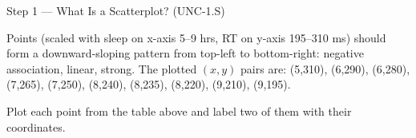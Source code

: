 \documentclass[10pt]{article}
\begin{document}
\begin{notesbox}{Step 1 --- What Is a Scatterplot? (UNC-1.S)}
\begin{teachernote}
Points (scaled with sleep on x-axis 5--9 hrs, RT on y-axis 195--310 ms) should form a
downward-sloping pattern from top-left to bottom-right: negative association, linear, strong.
The plotted $(x,y)$ pairs are: (5,310), (6,290), (6,280), (7,265), (7,250), (8,240),
(8,235), (8,220), (9,210), (9,195).
\end{teachernote}

\vspace{4pt}
Plot each point from the table above and label two of them with their coordinates.
\end{notesbox}

\vspace{0.1in}

\end{document}
